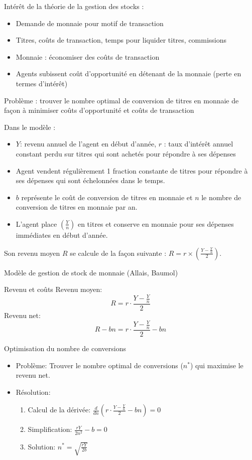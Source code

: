\documentclass[a4paper, 12pt]{report}
\begin{document}
Intérêt de la théorie de la gestion des stocks :
\begin{itemize}
	\item Demande de monnaie pour motif de transaction
	\item Titres, coûts de transaction, temps pour liquider titres, commissions
	\item Monnaie : économiser des coûts de transaction
	\item Agents subissent coût d'opportunité en détenant de la monnaie (perte en termes d'intérêt)
\end{itemize}

Problème : trouver le nombre optimal de conversion de titres en monnaie de façon à minimiser coûts d'opportunité et coûts de transaction

Dans le modèle :
\begin{itemize}
	\item $Y$: revenu annuel de l'agent en début d'année, $r$ : taux d'intérêt annuel constant perdu sur titres qui sont achetés pour répondre à ses dépenses
	\item Agent vendent régulièrement 1 fraction constante de titres pour répondre à ses dépenses qui sont échelonnées dans le temps.
	\item $b$ représente le coût de conversion de titres en monnaie et $n$ le nombre de conversion de titres en monnaie par an.
	\item L'agent place $(\frac{Y}{n})$ en titres et conserve en monnaie pour ses dépenses immédiates en début d'année.
\end{itemize}

Son revenu moyen $R$ se calcule de la façon suivante : $R = r \times (\frac{Y - \frac{Y}{n}}{2})$.

Modèle de gestion de stock de monnaie (Allais, Baumol)

Revenu et coûts
Revenu moyen:
$$R = r \cdot \frac{Y - \frac{Y}{n}}{2}$$
Revenu net:
$$R - bn = r \cdot \frac{Y - \frac{Y}{n}}{2} - bn$$

Optimisation du nombre de conversions
\begin{itemize}
	\item Problème: Trouver le nombre optimal de conversions ($n^*$) qui maximise le revenu net.
	\item Résolution:
	\begin{enumerate}
		\item Calcul de la dérivée: $\frac{d}{dn} \left( r \cdot \frac{Y - \frac{Y}{n}}{2} - bn \right) = 0$
		\item Simplification: $\frac{rY}{2n^2} - b = 0$
		\item Solution: $n^* = \sqrt{\frac{rY}{2b}}$
	\end{enumerate}
\end{itemize}
\end{document}
